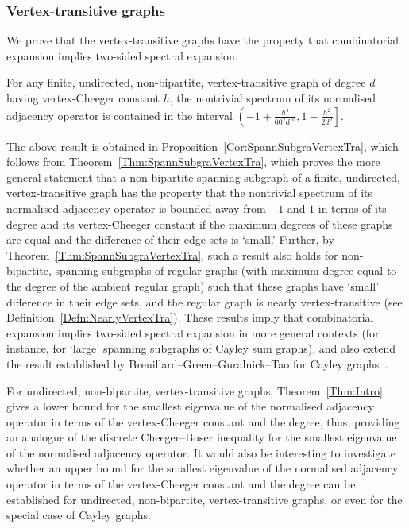 \documentclass[ALCO,Unicode,published]{cedram}
\begin{document}
\subsubsection{Vertex-transitive graphs}
We prove that the vertex-transitive graphs have the property that combinatorial expansion implies two-sided spectral expansion. 

\begin{theorem}
\label{Thm:Intro}
For any finite, undirected, non-bipartite, vertex-transitive graph of degree $d$ having vertex-Cheeger constant $h$, the nontrivial spectrum of its normalised adjacency operator is contained in the interval $\left(-1 + \frac{h^4}{60^2 d^{10}}, 1- \frac{h^2}{2d^2}\right]$. 
\end{theorem}

The above result is obtained in Proposition~\ref{Cor:SpannSubgraVertexTra}, which follows from Theorem~\ref{Thm:SpannSubgraVertexTra}, which proves the more general statement that a non-bipartite spanning subgraph of a finite, undirected, vertex-transitive graph has the property that the nontrivial spectrum of its normalised adjacency operator is bounded away from $-1$ and $1$ in terms of its degree and its vertex-Cheeger constant if the maximum degrees of these graphs are equal and the difference of their edge sets is `small.' Further, by Theorem~\ref{Thm:SpannSubgraVertexTra}, such a result also holds for non-bipartite, spanning subgraphs of regular graphs (with maximum degree equal to the degree of the ambient regular graph) such that these graphs have `small' difference in their edge sets, and the regular graph is nearly vertex-transitive (see Definition~\ref{Defn:NearlyVertexTra}). These results imply that combinatorial expansion implies two-sided spectral expansion in more general contexts (for instance, for `large' spanning subgraphs of Cayley sum graphs), and also extend the result  established by Breuillard--Green--Guralnick--Tao for Cayley graphs~\cite[Appendix E]{BGGTExpansionSimpleLie}. 

For undirected, non-bipartite, vertex-transitive graphs, Theorem~\ref{Thm:Intro} gives a lower bound for the smallest eigenvalue of the normalised adjacency operator in terms of the vertex-Cheeger constant and the degree, thus, providing an analogue of the discrete Cheeger--Buser inequality for the smallest eigenvalue of the normalised adjacency operator. It would also be interesting to investigate whether an upper bound for the smallest eigenvalue of the normalised adjacency operator in terms of the vertex-Cheeger constant and the degree can be established for undirected, non-bipartite, vertex-transitive graphs, or even for the special case of Cayley graphs. 
\end{document}
